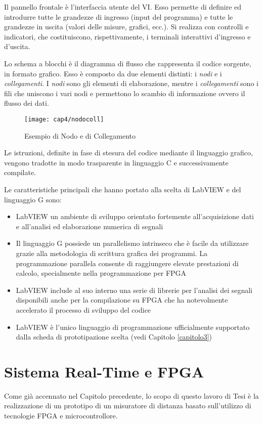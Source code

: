 Il pannello frontale è l'interfaccia utente del VI. Esso permette di definire ed introdurre tutte le grandezze di ingresso (input del programma) e tutte le grandezze in uscita (valori delle misure, grafici, ecc.). Si realizza con controlli e indicatori, che costituiscono, rispettivamente, i terminali interattivi d'ingresso e d'uscita.
 
Lo schema a blocchi è il diagramma di flusso che rappresenta il codice sorgente, in formato grafico. Esso è composto da due elementi distinti: i \textit{nodi} e i \textit{collegamenti}. I \textit{nodi} sono gli elementi di elaborazione, mentre i \textit{collegamenti} sono i fili che uniscono i vari nodi e permettono lo scambio di informazione ovvero il flusso dei dati.

\begin{figure}  
  \begin{center}
    \texttt{[image: cap4/nodocoll]}
    \caption{Esempio di Nodo e di Collegamento}
    \label{nodocoll}
  \end{center}
\end{figure}

Le istruzioni, definite in fase di stesura del codice mediante il linguaggio grafico, vengono tradotte in modo trasparente in linguaggio C e successivamente compilate.

Le caratteristiche principali che hanno portato alla scelta di LabVIEW e del linguaggio G sono:
\begin{itemize}
	\item LabVIEW un ambiente di sviluppo orientato fortemente all'acquisizione dati e all'analisi ed elaborazione numerica di segnali
	\item Il linguaggio G possiede un parallelismo intrinseco che è facile da utilizzare grazie alla metodologia di scrittura grafica dei programmi. La programmazione parallela consente di raggiungere elevate prestazioni di calcolo, specialmente nella programmazione per FPGA
	\item LabVIEW include al suo interno una serie di librerie per l'analisi dei segnali disponibili anche per la compilazione su FPGA che ha notevolmente accelerato il processo di sviluppo del codice
	\item LabVIEW è l'unico linguaggio di programmazione ufficialmente supportato dalla scheda di prototipazione scelta (vedi Capitolo \ref{capitolo3})
\end{itemize}

\section{Sistema Real-Time e FPGA}
Come già accennato nel Capitolo precedente, lo scopo di questo lavoro di Tesi è la realizzazione di un prototipo di un misuratore di distanza basato sull'utilizzo di tecnologie FPGA e microcontrollore.

